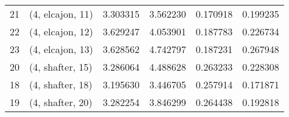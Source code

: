 \begin{tabular}{llrrrr}
21 &  (4, elcajon, 11) &   3.303315 &   3.562230 &   0.170918 &  0.199235 \\
22 &  (4, elcajon, 12) &   3.629247 &   4.053901 &   0.187783 &  0.226734 \\
23 &  (4, elcajon, 13) &   3.628562 &   4.742797 &   0.187231 &  0.267948 \\
20 &  (4, shafter, 15) &   3.286064 &   4.488628 &   0.263233 &  0.228308 \\
18 &  (4, shafter, 18) &   3.195630 &   3.446705 &   0.257914 &  0.171871 \\
19 &  (4, shafter, 20) &   3.282254 &   3.846299 &   0.264438 &  0.192818 \\
\bottomrule
\end{tabular}
